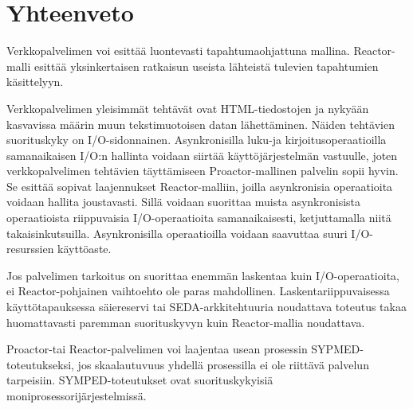 \documentclass[finnish]{tktltiki2}%
\theoremstyle{definition}
\theoremstyle{remark}
\begin{document}
\section{Yhteenveto}\label{sec:yhteenveto}

Verkkopalvelimen voi esittää luontevasti
tapahtumaohjattuna mallina. Reactor-malli esittää yksinkertaisen
ratkaisun useista lähteistä tulevien tapahtumien käsittelyyn.

Verkkopalvelimen yleisimmät tehtävät ovat
HTML-tiedostojen ja nykyään kasvavissa määrin
muun tekstimuotoisen datan lähettäminen.
Näiden tehtävien suorituskyky on
I/O-sidonnainen.
Asynkronisilla luku-ja kirjoitusoperaatioilla samanaikaisen I/O:n hallinta
voidaan siirtää käyttöjärjestelmän vastuulle, joten 
verkkopalvelimen tehtävien täyttämiseen Proactor-mallinen
palvelin sopii hyvin.
Se esittää sopivat laajennukset Reactor-malliin, joilla
asynkronisia operaatioita voidaan hallita joustavasti.
Sillä voidaan suorittaa muista asynkronisista operaatioista riippuvaisia I/O-operaatioita
samanaikaisesti, ketjuttamalla niitä takaisinkutsuilla.
Asynkronisilla operaatioilla voidaan saavuttaa suuri I/O-resurssien
käyttöaste.

Jos palvelimen tarkoitus on suorittaa enemmän laskentaa kuin
I/O-operaatioita, ei Reactor-pohjainen vaihtoehto ole paras mahdollinen.
Laskentariippuvaisessa käyttötapauksessa säiereservi tai SEDA-arkkitehtuuria
noudattava toteutus takaa huomattavasti paremman suorituskyvyn kuin
Reactor-mallia noudattava.

Proactor-tai Reactor-palvelimen voi laajentaa
usean prosessin SYPMED-toteutukseksi, jos skaalautuvuus
yhdellä prosessilla ei ole riittävä palvelun tarpeisiin.
SYMPED-toteutukset ovat suorituskykyisiä moniprosessorijärjestelmissä.



\end{document}
